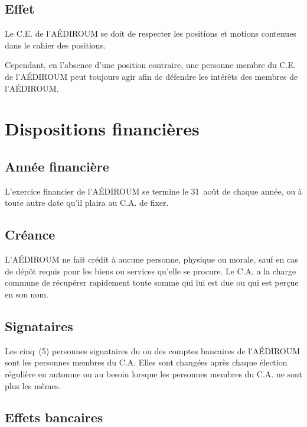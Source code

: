 \documentclass{aediroum}
\begin{document}
\subsection{Effet}\label{sec:effet-positions}

Le C.E. de l'AÉDIROUM se doit de respecter les positions et motions contenues dans le cahier des positions.

Cependant, en l'absence d'une position contraire, une personne membre du C.E. de l'AÉDIROUM peut toujours agir afin de défendre les intérêts des membres de l'AÉDIROUM.

\section{Dispositions financières}\label{sec:dispositions-financieres}

\subsection{Année financière}\label{sec:annee-financiere}

L'exercice financier de l'AÉDIROUM se termine le 31~août de chaque année, ou à toute autre date qu'il plaira au C.A. de fixer.

\subsection{Créance}\label{sec:creance}

L'AÉDIROUM ne fait crédit à aucune personne, physique ou morale, sauf en cas de dépôt requis pour les biens ou services qu'elle se procure. Le C.A. a la charge commune de récupérer rapidement toute somme qui lui est due ou qui est perçue en son nom.

\subsection{Signataires}\label{sec:signataires}

Les cinq~(5) personnes signataires du ou des comptes bancaires de l'AÉDIROUM sont les personnes membres du C.A. Elles sont changées après chaque élection régulière en automne ou au besoin lorsque les personnes membres du C.A. ne sont plus les mêmes.

\subsection{Effets bancaires}\label{sec:effets-bancaires}
\end{document}
